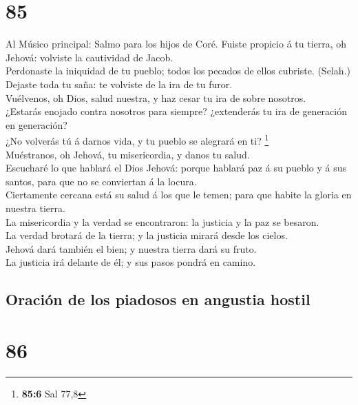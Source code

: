 \hypertarget{section-84}{%
\section{85}\label{section-84}}

 Al Músico principal: Salmo para los hijos de Coré. Fuiste
propicio á tu tierra, oh Jehová: volviste la cautividad de Jacob.\\
 Perdonaste la iniquidad de tu pueblo; todos los pecados
de ellos cubriste. (Selah.)\\
 Dejaste toda tu saña: te volviste de la ira de tu
furor.\\
 Vuélvenos, oh Dios, salud nuestra, y haz cesar tu ira de
sobre nosotros.\\
 ¿Estarás enojado contra nosotros para siempre?
¿extenderás tu ira de generación en generación?\\
 ¿No volverás tú á darnos vida, y tu pueblo se alegrará en
ti? \footnote{\textbf{85:6} Sal 77,8}\\
 Muéstranos, oh Jehová, tu misericordia, y danos tu
salud.\\
 Escucharé lo que hablará el Dios Jehová: porque hablará
paz á su pueblo y á sus santos, para que no se conviertan á la locura.\\
 Ciertamente cercana está su salud á los que le temen;
para que habite la gloria en nuestra tierra.\\
 La misericordia y la verdad se encontraron: la justicia
y la paz se besaron.\\
 La verdad brotará de la tierra; y la justicia mirará
desde los cielos.\\
 Jehová dará también el bien; y nuestra tierra dará su
fruto.\\
 La justicia irá delante de él; y sus pasos pondrá en
camino.

\hypertarget{oraciuxf3n-de-los-piadosos-en-angustia-hostil}{%
\subsection{Oración de los piadosos en angustia
hostil}\label{oraciuxf3n-de-los-piadosos-en-angustia-hostil}}

\hypertarget{section-85}{%
\section{86}\label{section-85}}

